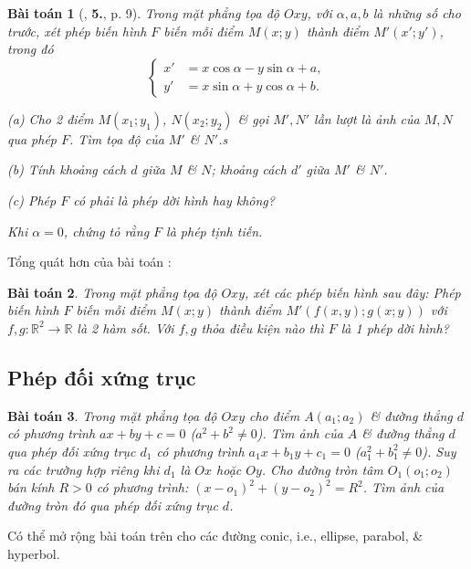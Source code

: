 \documentclass{article}
\numberwithin{equation}{section}
\newtheorem{baitoan}{Bài toán}[section]
\begin{document}
\begin{baitoan}[\cite{SGK_Toan_11_hinh_hoc_nang_cao}, \textbf{5.}, p. 9]
	Trong mặt phẳng tọa độ $Oxy$, với $\alpha,a,b$ là những số cho trước, xét phép biến hình $F$ biến mỗi điểm $M(x;y)$ thành điểm $M'(x';y')$, trong đó
	\begin{equation*}
		\left\{\begin{split}
			x' &= x\cos\alpha - y\sin\alpha + a,\\
			y' &= x\sin\alpha + y\cos\alpha + b.
		\end{split}\right.
	\end{equation*}
	\begin{enumerate*}
		\item[(a)] Cho 2 điểm $M(x_1;y_1)$, $N(x_2;y_2)$ \& gọi $M',N'$ lần lượt là ảnh của $M,N$ qua phép $F$. Tìm tọa độ của $M'$ \& $N'$.s
		\item[(b)] Tính khoảng cách $d$ giữa $M$ \& $N$; khoảng cách $d'$ giữa $M'$ \& $N'$.
		\item[(c)] Phép $F$ có phải là phép dời hình hay không?
		\item Khi $\alpha = 0$, chứng tỏ rằng $F$ là phép tịnh tiến.
	\end{enumerate*}
\end{baitoan}
Tổng quát hơn của bài toán \cite[\textbf{6.}, p. 9]{SGK_Toan_11_hinh_hoc_nang_cao}:
\begin{baitoan}
	Trong mặt phẳng tọa độ $Oxy$, xét các phép biến hình sau đây: Phép biến hình $F$ biến mỗi điểm $M(x;y)$ thành điểm $M'(f(x,y);g(x;y))$ với $f,g:\mathbb{R}^2\to\mathbb{R}$ là 2 hàm sốt. Với $f,g$ thỏa điều kiện nào thì $F$ là 1 phép dời hình?
\end{baitoan}


\subsection{Phép đối xứng trục}

\begin{baitoan}
	Trong mặt phẳng tọa độ $Oxy$ cho điểm $A(a_1;a_2)$ \& đường thẳng $d$ có phương trình $ax + by + c = 0$ ($a^2 + b^2\ne 0$). Tìm ảnh của $A$ \& đường thẳng $d$ qua phép đối xứng trục $d_1$ có phương trình $a_1x + b_1y + c_1 = 0$ ($a_1^2 + b_1^2\ne 0$). Suy ra các trường hợp riêng khi $d_1$ là $Ox$ hoặc $Oy$. Cho đường tròn tâm $O_1(o_1;o_2)$ bán kính $R > 0$ có phương trình: $(x - o_1)^2 + (y - o_2)^2 = R^2$. Tìm ảnh của đường tròn đó qua phép đối xứng trục $d$.
\end{baitoan}
Có thể mở rộng bài toán trên cho các đường conic, i.e., ellipse, parabol, \& hyperbol.
\end{document}
